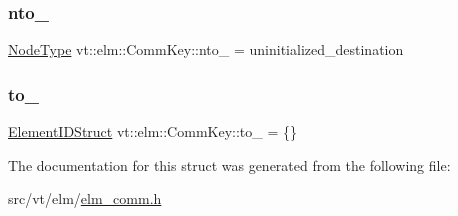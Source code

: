 \mbox{\label{structvt_1_1elm_1_1_comm_key_a30bf939bc0ba2ad6e9985d99fe478665}} 
\subsubsection{\texorpdfstring{nto\+\_\+}{nto\_}}
{\footnotesize\ttfamily \hyperlink{namespacevt_a866da9d0efc19c0a1ce79e9e492f47e2}{Node\+Type} vt\+::elm\+::\+Comm\+Key\+::nto\+\_\+ = uninitialized\+\_\+destination}

\mbox{\label{structvt_1_1elm_1_1_comm_key_ac7387154a0eef34bf4af0c4c5a42c38f}} 
\subsubsection{\texorpdfstring{to\+\_\+}{to\_}}
{\footnotesize\ttfamily \hyperlink{structvt_1_1elm_1_1_element_i_d_struct}{Element\+I\+D\+Struct} vt\+::elm\+::\+Comm\+Key\+::to\+\_\+ = \{\}}



The documentation for this struct was generated from the following file\+:\begin{DoxyCompactItemize}
\item 
src/vt/elm/\hyperlink{elm__comm_8h}{elm\+\_\+comm.\+h}\end{DoxyCompactItemize}

